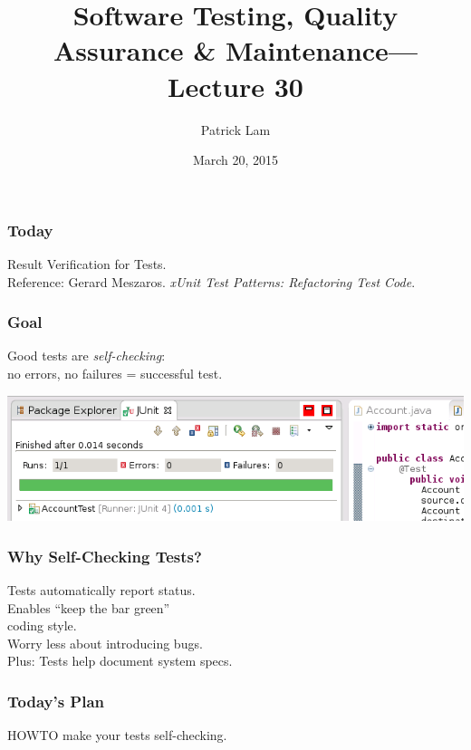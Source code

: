 \documentclass{beamer}
\title{Software Testing, Quality Assurance \& Maintenance---Lecture 30}
\author{Patrick Lam}
\date{March 20, 2015}
\newenvironment{changemargin}[1]{%
  \begin{list}{}{%
    \setlength{\topsep}{0pt}%
    \setlength{\leftmargin}{#1}%
    \setlength{\rightmargin}{1em}
    \setlength{\listparindent}{\parindent}%
    \setlength{\itemindent}{\parindent}%
    \setlength{\parsep}{\parskip}%
  }%
  \item[]}{\end{list}}
\begin{document}
\begin{frame}
  \titlepage
\end{frame}

\begin{frame}
\frametitle{Today}
\begin{changemargin}{2cm}
  Result Verification for Tests.\\[2em]
  Reference: Gerard Meszaros. \emph{xUnit Test Patterns: Refactoring Test Code}.
\end{changemargin}
\end{frame}

\begin{frame}
  \frametitle{Goal}

  \Large
  \begin{changemargin}{2cm}
    Good tests are \emph{self-checking}:\\[1em]
    no errors, no failures = successful test.
  \end{changemargin}

  \begin{center}
    \includegraphics[width=.6\textwidth]{L30/pass}
  \end{center}
  
\end{frame}

\begin{frame}
  \frametitle{Why Self-Checking Tests?}

  \Large
  \begin{changemargin}{2cm}
    Tests automatically report status.\\[1em]
    Enables ``keep the bar green''\\
    coding style.\\[1em]
    Worry less about introducing bugs.\\[1em]
    Plus: Tests help document system specs.
  \end{changemargin}
\end{frame}

\begin{frame}
  \frametitle{Today's Plan}

  \Large
  \begin{changemargin}{1cm}
    HOWTO make your tests self-checking.
  \end{changemargin}
\end{frame}
\end{document}
